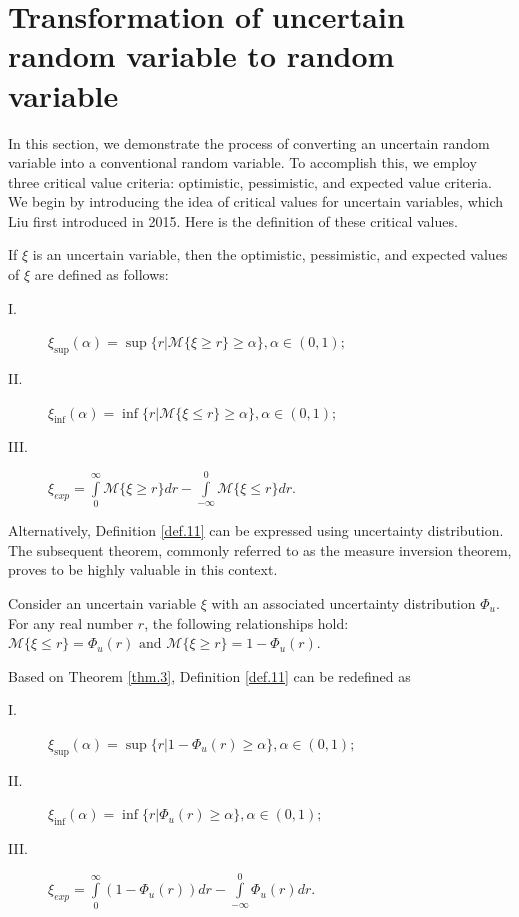 \section{ Transformation of uncertain random variable to random variable}\label{sec.3}
In this section, we demonstrate the process of converting an uncertain random variable into a conventional random variable. To accomplish this, we employ three critical value criteria: optimistic, pessimistic, and expected value criteria. We begin by introducing the idea of critical values for uncertain variables, which Liu \cite{Liu 2015} first introduced in 2015. Here is the definition of these critical values.
\begin{definition}\cite{Liu 2015,Yang 2015}\label{def.11}
	If $\xi$ is an uncertain variable, then the optimistic, pessimistic, and expected values of $\xi$ are defined as follows:
	\begin{description}
		\item[ I.] $\xi_{\sup}(\alpha)=\sup\{r|\mathcal{M}\{\xi\geq r\}\geq \alpha\},\alpha\in (0,1);$
		\item[ II.] $\xi_{\inf}(\alpha)=\inf\{r|\mathcal{M}\{\xi\leq r\}\geq \alpha\},\alpha\in (0,1);$
		\item[ III.] $\xi_{exp}=\int\limits_{0}^{\infty}\mathcal{M}\{\xi\geq r\}dr-
		\int\limits_{-\infty}^{0}\mathcal{M}\{\xi\leq r\}dr.$
	\end{description}
\end{definition} 
\par Alternatively, Definition \ref{def.11} can be expressed using uncertainty distribution. The subsequent theorem, commonly referred to as the measure inversion theorem, proves to be highly valuable in this context.
\begin{theorem}\cite{Liu 2015,Yang 2015}\label{thm.3}
	Consider an uncertain variable $\xi$ with an associated uncertainty distribution $\Phi_u$. For any real number $r$, the following relationships hold: $\mathcal{M}\{\xi\leq r\}=\Phi_u(r)\text{ and } \mathcal{M}\{\xi\geq r\}=1-\Phi_u(r).$
\end{theorem}
\par Based on Theorem \ref{thm.3}, Definition \ref{def.11} can be redefined as
\begin{description}
	\item[ I.] $\xi_{\sup}(\alpha)=\sup\{r|1-\Phi_u(r)\geq \alpha\},\alpha\in (0,1);$
	\item[ II.] $\xi_{\inf}(\alpha)=\inf\{r|\Phi_u(r)\geq \alpha\},\alpha\in (0,1);$
	\item[ III.] $\xi_{exp}=\int\limits_{0}^{\infty}(1-\Phi_u(r))dr-
	\int\limits_{-\infty}^{0}\Phi_u(r)dr.$
\end{description}

